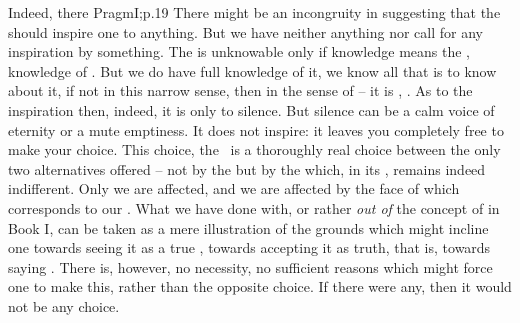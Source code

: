 Indeed, there \citet{can be no greater incongruity than [for a disciple of
  Spencer] to proclaim with one breath that the substance of things is
  unknowable, and with the next that the thought of it should inspire us with
  awe, reverence, and a willingness to add our co-operative push in the
  direction toward which its manifestations seem to be
  drifting.}{Pragm}{I;p.19} There might be an incongruity in suggesting that the
 should inspire one to anything. But we have neither anything
 nor call for any inspiration by something. The 
is unknowable only if knowledge means the  , knowledge
of . But we do have full knowledge of it, we know all that is to know
about it, if not in this narrow sense, then in the sense of  -- it is
, . As to the inspiration then,
indeed, it is only to silence. But silence can be a calm voice of eternity or a
mute emptiness. It does not inspire: it leaves you completely free to make your
choice.  This choice, the \sch\ is a thoroughly real {choice} between the only
two alternatives offered -- not by the  but by the 
which, in its , remains indeed indifferent. Only we are
affected, and we are affected by  the face of  which
corresponds to our .  What we have done with, or rather {\em out of}
the concept of  in Book I, can be taken as a mere illustration of
the grounds which might incline one towards seeing it as a true ,
towards accepting it as truth, that is, towards saying \yes. There is, however,
no necessity, no sufficient reasons which might force one to make this, rather
than the opposite choice. If there were any, then it would not be any choice.


